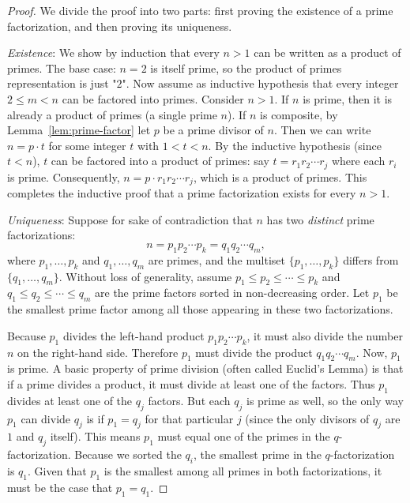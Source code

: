 \documentclass[11pt]{article}
\begin{document}
\begin{proof}
We divide the proof into two parts: first proving the existence of a prime factorization, and then proving its uniqueness.

\medskip\noindent\textit{Existence}: We show by induction that every $n>1$ can be written as a product of primes. The base case: $n=2$ is itself prime, so the product of primes representation is just "$2$". Now assume as inductive hypothesis that every integer $2 \leq m < n$ can be factored into primes. Consider $n>1$. If $n$ is prime, then it is already a product of primes (a single prime $n$). If $n$ is composite, by Lemma~\ref{lem:prime-factor} let $p$ be a prime divisor of $n$. Then we can write $n = p \cdot t$ for some integer $t$ with $1 < t < n$. By the inductive hypothesis (since $t < n$), $t$ can be factored into a product of primes: say $t = r_1 r_2 \cdots r_j$ where each $r_i$ is prime. Consequently, $n = p \cdot r_1 r_2 \cdots r_j$, which is a product of primes. This completes the inductive proof that a prime factorization exists for every $n>1$.

\medskip\noindent\textit{Uniqueness}: Suppose for sake of contradiction that $n$ has two \emph{distinct} prime factorizations:
\[ n = p_1 p_2 \cdots p_k = q_1 q_2 \cdots q_m, \] 
where $p_1, \ldots, p_k$ and $q_1, \ldots, q_m$ are primes, and the multiset $\{p_1,\dots,p_k\}$ differs from $\{q_1,\dots,q_m\}$. Without loss of generality, assume $p_1 \le p_2 \le \cdots \le p_k$ and $q_1 \le q_2 \le \cdots \le q_m$ are the prime factors sorted in non-decreasing order. Let $p_1$ be the smallest prime factor among all those appearing in these two factorizations. 

Because $p_1$ divides the left-hand product $p_1 p_2 \cdots p_k$, it must also divide the number $n$ on the right-hand side. Therefore $p_1$ must divide the product $q_1 q_2 \cdots q_m$. Now, $p_1$ is prime. A basic property of prime division (often called Euclid's Lemma) is that if a prime divides a product, it must divide at least one of the factors. Thus $p_1$ divides at least one of the $q_j$ factors. But each $q_j$ is prime as well, so the only way $p_1$ can divide $q_j$ is if $p_1 = q_j$ for that particular $j$ (since the only divisors of $q_j$ are $1$ and $q_j$ itself). This means $p_1$ must equal one of the primes in the $q$-factorization. Because we sorted the $q_i$, the smallest prime in the $q$-factorization is $q_1$. Given that $p_1$ is the smallest among all primes in both factorizations, it must be the case that $p_1 = q_1$. 


\end{proof}
\end{document}
